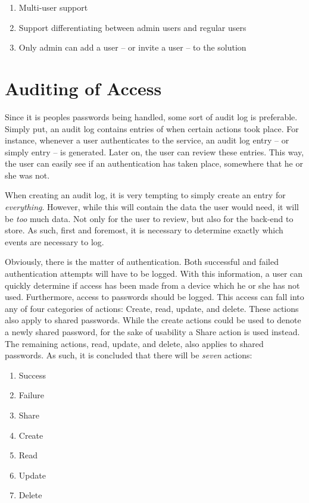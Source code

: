 			\vspace{-3ex}\begin{enumerate}
				\setlength\itemsep{0.1em}
				\setcounter{enumi}{2-1}
				\item Multi-user support
				\item Support differentiating between admin users and regular users
				\setcounter{enumi}{6-1}
				\item Only admin can add a user -- or invite a user -- to the solution
			\end{enumerate}

	\section{Auditing of Access}
		\label{sec:audit}
		Since it is peoples passwords being handled, some sort of audit log is preferable. Simply put, an audit log contains entries of when certain actions took place. For instance, whenever a user authenticates to the service, an audit log entry -- or simply entry -- is generated. Later on, the user can review these entries. This way, the user can easily see if an authentication has taken place, somewhere that he or she was not.

		When creating an audit log, it is very tempting to simply create an entry for \emph{everything}. However, while this will contain the data the user would need, it will be \emph{too} much data. Not only for the user to review, but also for the back-end to store. As such, first and foremost, it is necessary to determine exactly which events are necessary to log.

		Obviously, there is the matter of authentication. Both successful and failed authentication attempts will have to be logged. With this information, a user can quickly determine if access has been made from a device which he or she has not used. Furthermore, access to passwords should be logged. This access can fall into any of four categories of actions: Create, read, update, and delete. These actions also apply to shared passwords. While the create actions could be used to denote a newly shared password, for the sake of usability a Share action is used instead. The remaining actions, read, update, and delete, also applies to shared passwords. As such, it is concluded that there will be \emph{seven} actions:
		\begin{enumerate}
			\item Success
			\item Failure
			\item Share
			\item Create
			\item Read
			\item Update
			\item Delete
		\end{enumerate}

